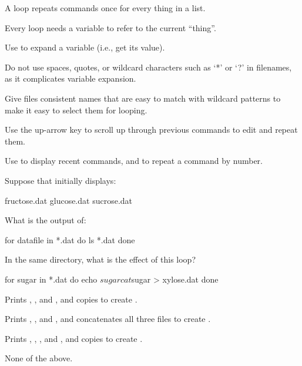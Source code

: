 \begin{keypoints}
\begin{swcitemize}
\item
  A  loop repeats commands once for every thing in a list.
\item
  Every  loop needs a variable to refer to the current
  ``thing''.
\item
  Use  to expand a variable (i.e., get its value).
\item
  Do not use spaces, quotes, or wildcard characters such as `*' or `?'
  in filenames, as it complicates variable expansion.
\item
  Give files consistent names that are easy to match with wildcard
  patterns to make it easy to select them for looping.
\item
  Use the up-arrow key to scroll up through previous commands to edit
  and repeat them.
\item
  Use  to display recent commands, and 
  to repeat a command by number.
\end{swcitemize}
\end{keypoints}

\begin{challenge}
  Suppose that  initially displays:

\begin{VerbOut}
fructose.dat    glucose.dat   sucrose.dat
\end{VerbOut}

  \noindent
  What is the output of:

\begin{VerbIn}
for datafile in *.dat
do
    ls *.dat
done
\end{VerbIn}
\end{challenge}

\begin{challenge}
  In the same directory, what is the effect of this loop?

\begin{VerbIn}
for sugar in *.dat
do
    echo $sugar
    cat $sugar > xylose.dat
done
\end{VerbIn}

  \begin{swcenumerate}
  \item
    Prints , , and
    , and copies  to create
    .
  \item
    Prints , , and
    , and concatenates all three files to create
    .
  \item
    Prints , ,
    , and , and copies
     to create .
  \item
    None of the above.
  \end{swcenumerate}
\end{challenge}

